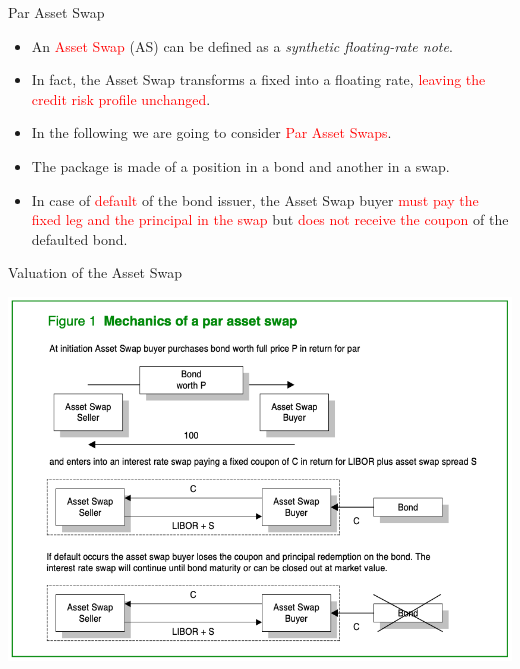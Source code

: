 \documentclass{beamer}
\begin{document}
\begin{frame}{Par Asset Swap}
	\begin{itemize}
		\item An \textcolor{red}{Asset Swap} (AS) can be defined as a \emph{synthetic floating-rate note}.
		\item In fact, the Asset Swap transforms a fixed into a floating rate, \textcolor{red}{leaving the credit risk profile unchanged}.
		\item In the following we are going to consider \textcolor{red}{Par Asset Swaps}. 
		\item The package is made of a position in a bond and another in a swap.
		\item In case of \textcolor{red}{default} of the bond issuer, the Asset Swap buyer \textcolor{red}{must pay the fixed leg and the principal in the swap} but \textcolor{red}{does not receive the coupon} of the defaulted bond. 
	\end{itemize}
\end{frame}

\begin{frame}{Valuation of the Asset Swap}
	\begin{center}
		\includegraphics[width=0.7\linewidth]{asset_swap}
	\end{center}
\end{frame}
\end{document}
